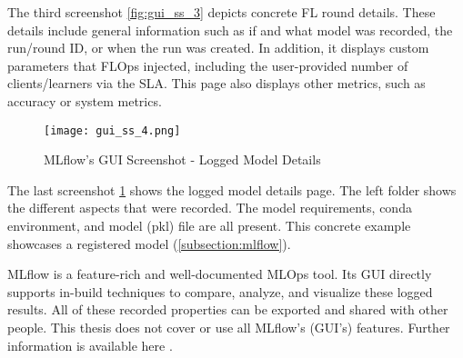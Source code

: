 The third screenshot \ref{fig:gui_ss_3} depicts concrete FL round details.
These details include general information such as if and what model was recorded, the run/round ID, or when the run was created.
In addition, it displays custom parameters that FLOps injected, including the user-provided number of clients/learners via the SLA.
This page also displays other metrics, such as accuracy or system metrics.

\begin{figure}[p]
    \begin{adjustwidth}{-0.1\paperwidth}{-0.1\paperwidth}
        \centering
        \texttt{[image: gui\_ss\_4.png]}
        \caption{MLflow's GUI Screenshot - Logged Model Details}
        \label{fig:gui_ss_4}
    \end{adjustwidth}
\end{figure}

The last screenshot \ref{fig:gui_ss_4} shows the logged model details page.
The left folder shows the different aspects that were recorded.
The model requirements, conda environment, and model (pkl) file are all present.
This concrete example showcases a registered model (\ref{subsection:mlflow}).

MLflow is a feature-rich and well-documented MLOps tool.
Its GUI directly supports in-build techniques to compare, analyze, and visualize these logged results.
All of these recorded properties can be exported and shared with other people.
This thesis does not cover or use all MLflow's (GUI's) features.
Further information is available here \cite{mlflow:homepage,mlflow:docs}.